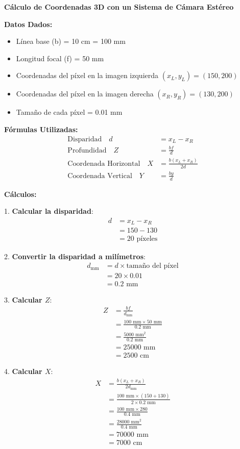 \documentclass{article}
\begin{document}
\textbf{Cálculo de Coordenadas 3D con un Sistema de Cámara Estéreo}

\textbf{Datos Dados:}
\begin{itemize}
    \item Línea base (b) = 10 cm = 100 mm
    \item Longitud focal (f) = 50 mm
    \item Coordenadas del píxel en la imagen izquierda $(x_L, y_L) = (150, 200)$
    \item Coordenadas del píxel en la imagen derecha $(x_R, y_R) = (130, 200)$
    \item Tamaño de cada píxel = 0.01 mm
\end{itemize}

\textbf{Fórmulas Utilizadas:}
\begin{align}
    \text{Disparidad} \quad d &= x_L - x_R \\
    \text{Profundidad} \quad Z &= \frac{bf}{d} \\
    \text{Coordenada Horizontal} \quad X &= \frac{b(x_L + x_R)}{2d} \\
    \text{Coordenada Vertical} \quad Y &= \frac{by}{d}
\end{align}

\textbf{Cálculos:}

1. \textbf{Calcular la disparidad}:
\begin{align}
    d &= x_L - x_R \\
    &= 150 - 130 \\
    &= 20 \text{ píxeles}
\end{align}

2. \textbf{Convertir la disparidad a milímetros}:
\begin{align}
    d_{\text{mm}} &= d \times \text{tamaño del píxel} \\
    &= 20 \times 0.01 \\
    &= 0.2 \text{ mm}
\end{align}

3. \textbf{Calcular \(Z\)}:
\begin{align}
    Z &= \frac{bf}{d_{\text{mm}}} \\
    &= \frac{100 \text{ mm} \times 50 \text{ mm}}{0.2 \text{ mm}} \\
    &= \frac{5000 \text{ mm}^2}{0.2 \text{ mm}} \\
    &= 25000 \text{ mm} \\
    &= 2500 \text{ cm}
\end{align}

4. \textbf{Calcular \(X\)}:
\begin{align}
    X &= \frac{b(x_L + x_R)}{2d_{\text{mm}}} \\
    &= \frac{100 \text{ mm} \times (150 + 130)}{2 \times 0.2 \text{ mm}} \\
    &= \frac{100 \text{ mm} \times 280}{0.4 \text{ mm}} \\
    &= \frac{28000 \text{ mm}^2}{0.4 \text{ mm}} \\
    &= 70000 \text{ mm} \\
    &= 7000 \text{ cm}
\end{align}
\end{document}
